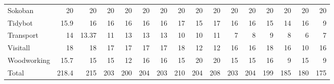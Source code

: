 \begin{table}[htb]
\begin{tabular}{lrrrrrrrrrrrrrrr}
Sokoban                  & 20                                 & 20              & 20              & 20              & 20              & 20                              & 20                    & 20                   & 20                   & 20                     & 20                     & 20                              & 20                    & 20                      & 20                      \\
Tidybot                  & 15.9                               & 16              & 16              & 16              & 16              & 16                              & 17                    & 15                   & 17                   & 16                     & 16                     & 15                              & 14                    & 16                      & 9                       \\
Transport                & 14                                 & 13.37           & 11              & 13              & 13              & 13                              & 10                    & 10                   & 11                   & 7                      & 8                      & 9                               & 8                     & 6                       & 7                       \\
Visitall                 & 18                                 & 18              & 17              & 17              & 17              & 17                              & 18                    & 12                   & 12                   & 16                     & 16                     & 18                              & 16                    & 10                      & 16                      \\
Woodworking              & 15.7                               & 15              & 15              & 12              & 16              & 16                              & 15                    & 20                   & 20                   & 15                     & 15                     & 16                              & 9                     & 15                      & 9                       \\ \hline
Total                    & 218.4                              & 215             & 203             & 200             & 204             & 203                             & 210                   & 204                  & 208                  & 203                    & 204                    & 199                             & 185                   & 180                     & 175                     \\ \hline
\end{tabular}
\label{tb_two}
\end{table}


